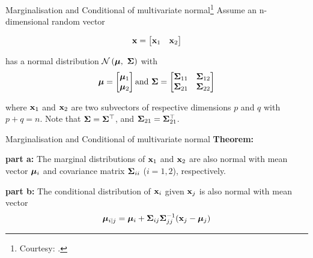 \documentclass{beamer}
\begin{document}
\begin{frame}{Marginalisation and Conditional of multivariate normal\footnote{Courtesy: \nodeSeven.}}
	Assume an n-dimensional random vector
	
	\begin{equation}
	{\mathbf{x}}=\begin{bmatrix}\mathbf{x}_1 & \mathbf{x}_2\end{bmatrix} 
	\end{equation}
	
	has a normal distribution $\mathcal{N}\left(\boldsymbol{\mu}, \ \boldsymbol{\Sigma}\right)$ with
	\begin{gather}\boldsymbol{\mu}=
	\begin{bmatrix}
	\boldsymbol{\mu}_1 \\
	\boldsymbol{\mu}_2
	\end{bmatrix} 
	\text{and }
	\boldsymbol{\Sigma} = \begin{bmatrix}
	\boldsymbol{\Sigma}_{11}& \boldsymbol{\Sigma}_{12}\\
	\boldsymbol{\Sigma}_{21}&\boldsymbol{\Sigma}_{22}
	\end{bmatrix} 
	\end{gather}

	where $\mathbf{x}_1$ and $\mathbf{x}_2$ are two subvectors of respective dimensions $p$ and $q$ with $p+q=n$. Note that $\boldsymbol{\Sigma}=\boldsymbol{\Sigma}^\top$, and $\boldsymbol{\Sigma}_{21}=\boldsymbol{\Sigma}_{21}^\top$.
\end{frame}

\begin{frame}{Marginalisation and Conditional of multivariate normal}
	\textbf{Theorem:}
	
	\textbf{part a:} The marginal distributions of $\mathbf{x}_1$ and $\mathbf{x}_2$ are also normal with mean vector $\boldsymbol{\mu}_i$ and covariance matrix $\boldsymbol{\Sigma}_{ii}$ ($i=1,2$), respectively.
	
	\textbf{part b:} The conditional distribution of $\mathbf{x}_i$ given $\mathbf{x}_j$ is also normal with mean vector
	\begin{gather}
	\boldsymbol{\mu}_{i|j} = \boldsymbol{\mu}_i + \boldsymbol{\Sigma}_{ij}\boldsymbol{\Sigma}_{jj}^{-1}(\mathbf{x}_j - \boldsymbol{\mu}_j)\\
	\end{gather}
\end{frame}
\end{document}
